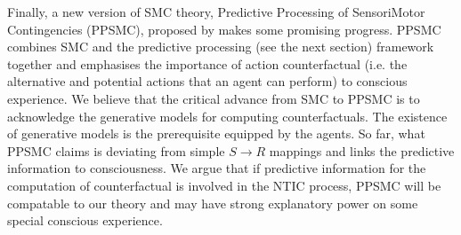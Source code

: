 \documentclass[utf8]{article}
\begin{document}
        Finally, a new version of SMC theory, Predictive Processing of SensoriMotor Contingencies (PPSMC), proposed by \cite{seth2014predictive, seth2015presence} makes some promising progress. PPSMC combines SMC and the predictive processing (see the next section) framework together and emphasises the importance of action counterfactual (i.e. the alternative and potential actions that an agent can perform) to conscious experience. We believe that the critical advance from SMC to PPSMC is to acknowledge the generative models for computing counterfactuals. The existence of generative models is the prerequisite equipped by the agents. So far, what PPSMC claims is deviating from simple $S\rightarrow{}R$ mappings and links the predictive information to consciousness. We argue that if predictive information for the computation of counterfactual is involved in the NTIC process, PPSMC will be compatable to our theory and may have strong explanatory power on some special conscious experience. 
\end{document}
